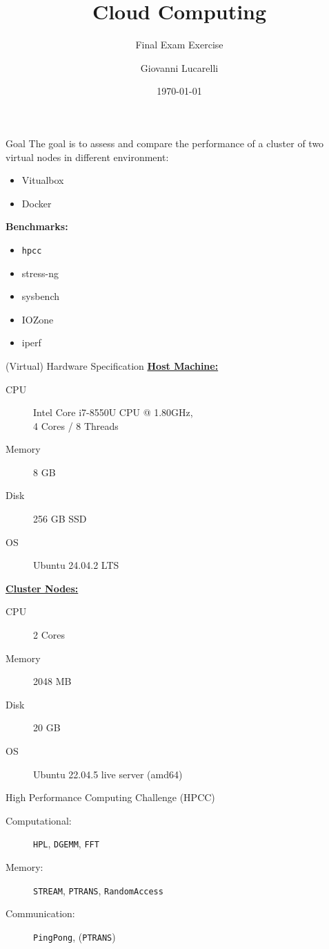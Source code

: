 \documentclass[10pt]{beamer}
\title{Cloud Computing}
\subtitle{Final Exam Exercise}
\date{\today}
\author[longname]{Giovanni Lucarelli}
\begin{document}
\maketitle

\begin{frame}{Goal}
  The goal is to assess and compare the performance of a cluster of two virtual nodes in different environment:
  \begin{itemize}
    \item Vitualbox
    \item Docker
  \end{itemize}
  \textbf{Benchmarks:}
  \begin{itemize}
    \item \texttt{hpcc}
    \item stress-ng
    \item sysbench
    \item IOZone
    \item iperf
  \end{itemize}
\end{frame}

\begin{frame}{(Virtual) Hardware Specification}
\textbf{\underline{Host Machine:}}
\begin{description}
  \item[CPU] Intel Core i7-8550U CPU @ 1.80GHz, \\4 Cores / 8 Threads
  \item[Memory] 8 GB
  \item[Disk] 256 GB SSD
  \item[OS] Ubuntu 24.04.2 LTS
\end{description}

\textbf{\underline{Cluster Nodes:}}
\begin{description}
  \item[CPU] 2 Cores
  \item[Memory] 2048 MB
  \item[Disk] 20 GB
  \item[OS] Ubuntu 22.04.5 live server (amd64)   
\end{description}
\end{frame}

\begin{frame}{High Performance Computing Challenge (HPCC)}
  \begin{description}
    \item[Computational:] \texttt{HPL}, \texttt{DGEMM}, \texttt{FFT}
    \item[Memory:] \texttt{STREAM}, \texttt{PTRANS}, \texttt{RandomAccess}
    \item[Communication:] \texttt{PingPong}, (\texttt{PTRANS})
  \end{description}
\end{frame}
\end{document}
